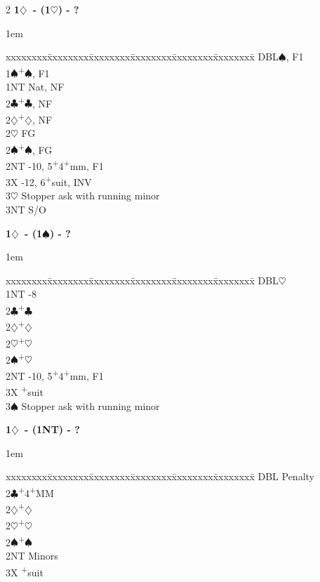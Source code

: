 \documentclass[10pt]{article}
\renewcommand{\c}{$\clubsuit$}
\renewcommand{\d}{$\diamondsuit$}
\newcommand{\h}{$\heartsuit$}
\newcommand{\s}{$\spadesuit$}
\newcommand{\p}{\textsuperscript{+}}
\newcommand{\x}{DBL}
\newenvironment{bidtable}[1][]
{\textbf{#1}
  \begin{adjustwidth}{1em}{}
    \addvspace{2pt}
    \begin{tabbing}
      xxxxxxxx\=xxxxxxxx\=xxxxxxxx\=xxxxxxxx\=xxxxxxxx\=xxxxxxxx\=\kill}
{\end{tabbing}\end{adjustwidth}\bigskip}%
\begin{document}
\begin{multicols*}{2}
\begin{bidtable}[1\d\ - (1\h) - ?]
\x  {}\s, F1                        \\
1\s {}\p\s, F1                      \\
1NT \> Nat, NF                        \\
2\c {}\p\c, NF                      \\
2\d {}\p\d, NF                      \\
2\h \> FG                             \\
2\s {}\p\s, FG                      \\
2NT -10, 5\p4\p mm, F1                \\
3X  -12, 6\p suit, INV            \\
3\h \> Stopper ask with running minor \\
3NT \> S/O                            \\
\end{bidtable}

\begin{bidtable}[1\d\ - (1\s) - ?]
\x  {}\h                            \\
1NT -8                            \\
2\c {}\p\c                          \\
2\d {}\p\d                          \\
2\h {}\p\h                          \\
2\s {}\p\h                          \\
2NT -10, 5\p4\p mm, F1            \\
3X  \p suit                       \\
3\s \> Stopper ask with running minor \\
\end{bidtable}

\begin{bidtable}[1\d\ - (1NT) - ?]
\x  \> Penalty                        \\
2\c {}\p 4\p MM                     \\
2\d {}\p\d                          \\
2\h {}\p\h                          \\
2\s {}\p\s                          \\
2NT \> Minors                         \\
3X  \p suit                       \\
\end{bidtable}


\end{multicols*}
\end{document}
